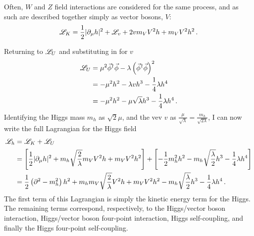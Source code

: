     Often, $W$ and $Z$ field interactions are considered for the same process,
        and as such are described together simply as vector bosons, $V$:
    \begin{equation} \begin{split}
        \mathscr{L}_K = \frac{1}{2} | \partial_{\mu}h |^2 + \mathscr{L}_v
            + 2 v m_V V^2 h + m_V V^2 h^2
        \,.
    \end{split} \end{equation}

    \noindent Returning to $\mathscr{L}_U$ and substituting in for $v$
    \begin{equation} \begin{split}
        \mathscr{L}_U &= \mu^2 \vec{\phi}^\dag \vec{\phi} - \lambda \left( \vec{\phi}^\dag\vec{\phi} \right)^2
        \\&= - \mu^2 h^2 -\lambda v h^3 - \frac{1}{4} \lambda h^4
        \\&= - \mu^2 h^2 - \mu \sqrt\lambda h^3 - \frac{1}{4} \lambda h^4
        \,.
    \end{split} \end{equation}
    Identifying the Higgs mass $m_h$ as $\sqrt{2}\mu$,
        and the vev $v$ as $\frac{\mu}{\sqrt{\lambda}} = \frac{m_h}{\sqrt{2 \lambda}}$,
        I can now write the full Lagrangian for the Higgs field\cite{Halzen_book}
    \begin{equation} \begin{split} \label{eq:higgsfull}
        \mathscr{L}_h &= \mathscr{L}_K + \mathscr{L}_U
        \\&= \left[ \frac{1}{2} | \partial_{\mu}h |^2
            + m_h \sqrt{\frac{2}{\lambda}}  m_V V^2 h + m_V V^2 h^2 \right]
            + \left[ - \frac{1}{2} m^2_h h^2 - m_h \sqrt{\frac{\lambda}{2}} h^3 - \frac{1}{4} \lambda h^4 \right]
        \\&= \frac{1}{2} \left(\partial^2 - m_h^2 \right) h^2
            + m_h m_V \sqrt{\frac{2}{\lambda}} V^2 h + m_V V^2 h^2
            - m_h \sqrt{\frac{\lambda}{2}} h^3 - \frac{1}{4} \lambda h^4
        \,.
    \end{split} \end{equation}
    The first term of this Lagrangian is simply the kinetic energy term for the Higgs.
    The remaining terms correspond, respectively,
        to the Higgs/vector boson interaction,
        Higgs/vector boson four-point interaction,
        Higgs self-coupling,
        and finally the Higgs four-point self-coupling.

